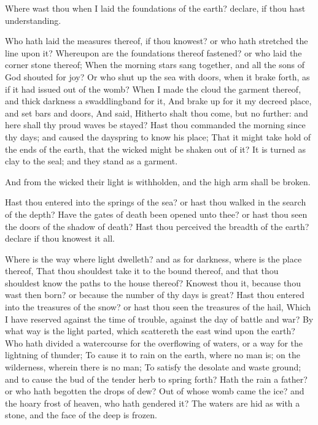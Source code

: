 \verse Where wast thou when I laid the foundations of the earth?  declare, if thou hast understanding.

\verse Who hath laid the measures thereof, if thou knowest? or who hath stretched the line upon it?  \verse Whereupon are the foundations thereof fastened? or who laid the corner stone thereof; \verse When the morning stars sang together, and all the sons of God shouted for joy?  \verse Or who shut up the sea with doors, when it brake forth, as if it had issued out of the womb?  \verse When I made the cloud the garment thereof, and thick darkness a swaddlingband for it, \verse And brake up for it my decreed place, and set bars and doors, \verse And said, Hitherto shalt thou come, but no further: and here shall thy proud waves be stayed?  \verse Hast thou commanded the morning since thy days; and caused the dayspring to know his place; \verse That it might take hold of the ends of the earth, that the wicked might be shaken out of it?  \verse It is turned as clay to the seal; and they stand as a garment.

\verse And from the wicked their light is withholden, and the high arm shall be broken.

\verse Hast thou entered into the springs of the sea? or hast thou walked in the search of the depth?  \verse Have the gates of death been opened unto thee? or hast thou seen the doors of the shadow of death?  \verse Hast thou perceived the breadth of the earth? declare if thou knowest it all.

\verse Where is the way where light dwelleth? and as for darkness, where is the place thereof, \verse That thou shouldest take it to the bound thereof, and that thou shouldest know the paths to the house thereof?  \verse Knowest thou it, because thou wast then born? or because the number of thy days is great?  \verse Hast thou entered into the treasures of the snow? or hast thou seen the treasures of the hail, \verse Which I have reserved against the time of trouble, against the day of battle and war?  \verse By what way is the light parted, which scattereth the east wind upon the earth?  \verse Who hath divided a watercourse for the overflowing of waters, or a way for the lightning of thunder; \verse To cause it to rain on the earth, where no man is; on the wilderness, wherein there is no man; \verse To satisfy the desolate and waste ground; and to cause the bud of the tender herb to spring forth?  \verse Hath the rain a father? or who hath begotten the drops of dew?  \verse Out of whose womb came the ice? and the hoary frost of heaven, who hath gendered it?  \verse The waters are hid as with a stone, and the face of the deep is frozen.

